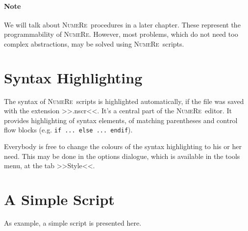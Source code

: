 \documentclass[DIV=14,headsepline,footsepline]{scrbook}
\newcommand{\NR}{\textsc{Nu\-me\-Re}}
\begin{document}
				\paragraph{Note}
					We will talk about \NR\ procedures in a later chapter. These represent the programmability of \NR. However, most problems, which do not need too complex abstractions, may be solved using \NR\ scripts.
				
			\section{Syntax Highlighting}
				The syntax of \NR\ scripts is highlighted automatically, if the file was saved with the extension >>.nscr<<. It's a central part of the \NR\ editor. It provides highlighting of syntax elements, of matching parentheses and control flow blocks (e.g. \lstinline+if ... else ... endif+).
				
				Everybody is free to change the colours of the syntax highlighting to his or her need. This may be done in the options dialogue, which is available in the tools menu, at the tab >>Style<<. 
			\section{A Simple Script}
				As example, a simple script is presented here.
				
\end{document}
